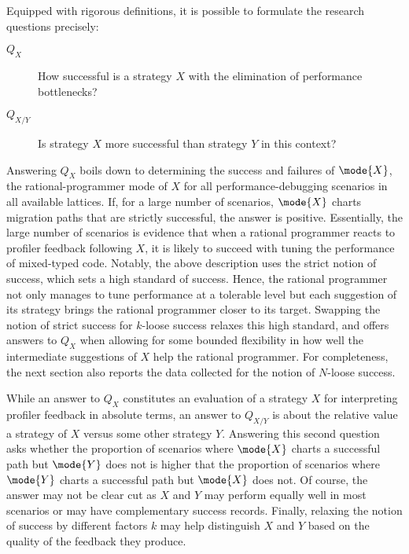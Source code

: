 
Equipped with rigorous definitions, it is possible to formulate the research
questions precisely:
\begin{description}

\item[$Q_X$] How successful is a strategy $X$ with the elimination of
  performance bottlenecks?

\item[$Q_{X/Y}$] Is strategy $X$ more successful than strategy $Y$ in this
  context?
  
\end{description}

Answering $Q_X$ boils down to determining the success and failures of
$\mode{X}$, the rational-programmer mode of $X$ for all performance-debugging
scenarios in all available lattices. If, for a large number of scenarios,
$\mode{X}$ charts migration paths that are strictly successful, the answer is
positive. Essentially, the large number of scenarios is evidence that when a
rational programmer reacts to profiler feedback following $X$, it is likely to
succeed with tuning the performance of mixed-typed code. Notably, the above
description uses the strict notion of success, which sets a high standard of
success. Hence, the rational programmer not only manages to tune performance at
a tolerable level but each suggestion of its strategy brings the rational
programmer closer to its target. Swapping the notion of strict success for
$k$-loose success relaxes this high standard, and offers answers to $Q_X$ when
allowing for some bounded flexibility in how well the intermediate suggestions
of $X$ help the rational programmer. For completeness, the next section also
reports the data collected for the notion of $N$-loose success.

While an answer to $Q_X$ constitutes an evaluation of a strategy $X$ for
interpreting profiler feedback in absolute terms, an answer to $Q_{X/Y}$ is
about the relative value a strategy of $X$ versus some other strategy
$Y$. Answering this second question asks whether the proportion of scenarios
where $\mode{X}$ charts a successful path but $\mode{Y}$ does not is higher that
the proportion of scenarios where $\mode{Y}$ charts a successful path but
$\mode{X}$ does not. Of course, the answer may not be clear cut as $X$ and $Y$
may perform equally well in most scenarios or may have complementary success
records. Finally, relaxing the notion of success by different factors $k$ may
help distinguish $X$ and $Y$ based on the quality of the feedback they produce.

